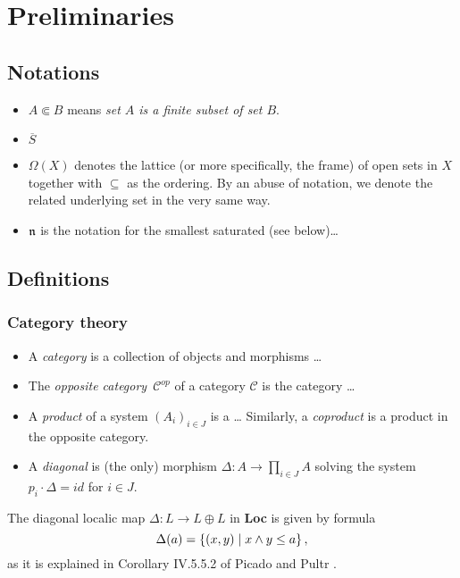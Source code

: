\chapter*{Preliminaries}

\section*{Notations}

\begin{itemize}
\item $A \Subset B$ means {\sl set $A$ is a finite subset of set $B$\/}.
\item $\overline{S}$ 
\item $\Omega(X)$ denotes the lattice (or more specifically, the frame) of open
sets in $X$ together with $\subseteq$ as the ordering. 
By an abuse of notation, we denote the related underlying set in the very same
way.
\item $\mathfrak{n}$ is the notation for the smallest saturated (see below)\ldots
\end{itemize}

\section*{Definitions}

\subsection*{Category theory}

\begin{itemize}
\item A \emph{category} is a collection of objects and morphisms \ldots
\item The \emph{opposite category}~$\mathcal{C}^{op}$ of a category
$\mathcal{C}$ is the category \ldots
\item A \emph{product} of a system $\left(A_i\right)_{i\in J}$ is a \ldots
Similarly, a \emph{coproduct} is a product in the opposite category.
\item A \emph{diagonal} is (the only) morphism $\Delta\colon A \to \prod_{i\in
J} A$ solving the system $p_i\cdot \Delta = id$ for $i \in J$.
\end{itemize}

\begin{exmpl} \label{diag-in-Loc}
  The diagonal localic map $\Delta\colon L \to L \oplus L$ in {\bf Loc} is
  given by formula
  \[
    \Delta(a) = \left\{ (x, y) \mid x \wedge y \leq a \right\},
  \]
  as it is explained in Corollary IV.5.5.2 of Picado and Pultr
  \cite{picado-pultr12}.
\end{exmpl}

